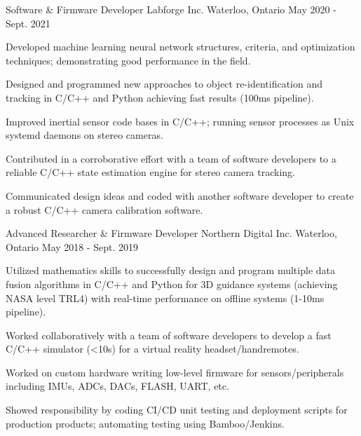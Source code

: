 \begin{cventries}
  \cventry
    {Software \& Firmware Developer} %
    {Labforge Inc.} %
    {Waterloo, Ontario} %
    {May 2020 - Sept. 2021} %
    {
      \begin{cvitems} %
        \item {Developed machine learning neural network structures, criteria, and optimization techniques; demonstrating good performance in the field.}
        \item {Designed and programmed new approaches to object re-identification and tracking in C/C++ and Python achieving fast results (100ms pipeline).}
        \item {Improved inertial sensor code bases in C/C++; running sensor processes as Unix systemd daemons on stereo cameras.}
        \item {Contributed in a corroborative effort with a team of software developers to a reliable C/C++ state estimation engine for stereo camera tracking.}
        \item {Communicated design ideas and coded with another software developer to create a robust C/C++ camera calibration software.}
      \end{cvitems}
    }

  \cventry
    {Advanced Researcher \& Firmware Developer} %
    {Northern Digital Inc.} %
    {Waterloo, Ontario} %
    {May 2018 - Sept. 2019} %
    {
      \begin{cvitems} %
        \item {Utilized mathematics skills to successfully design and program multiple data fusion algorithms in C/C++ and Python for 3D guidance systems (achieving NASA level TRL4) with real-time performance on offline systems (1-10ms pipeline).}
        \item {Worked collaboratively with a team of software developers to develop a fast C/C++ simulator (<10s) for a virtual reality headset/handremotes.}
        \item {Worked on custom hardware writing low-level firmware for sensors/peripherals including IMUs, ADCs, DACs, FLASH, UART, etc.}
        \item {Showed responsibility by coding CI/CD unit testing and deployment scripts for production products; automating testing using Bamboo/Jenkins.}
      \end{cvitems}
    }


\end{cventries}
